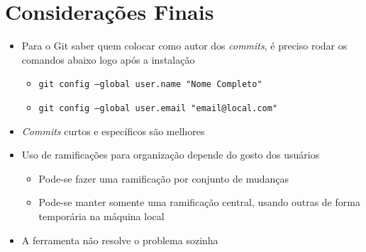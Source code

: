 \documentclass{beamer}
\newenvironment{slide}{\begin{frame}{\insertsection}}{\end{frame}}
\begin{document}
\section{Considerações Finais}
\begin{slide}
    \begin{itemize}
        \item Para o Git saber quem colocar como autor dos \emph{commits}, é
            preciso rodar os comandos abaixo logo após a instalação
            \begin{itemize}
                \pause
                \item \texttt{git config --global user.name "Nome Completo"}
                \item \texttt{git config --global user.email "email@local.com"}
            \end{itemize}
        \pause
        \item \emph{Commits} curtos e específicos são melhores
        \pause
        \item Uso de ramificações para organização depende do gosto dos usuários
        \begin{itemize}
            \pause
            \item Pode-se fazer uma ramificação por conjunto de mudanças
            \pause
            \item Pode-se manter somente uma ramificação central, usando outras
                de forma temporária na máquina local
        \end{itemize}
        \pause
        \item A ferramenta não resolve o problema sozinha
    \end{itemize}
\end{slide}
\end{document}
